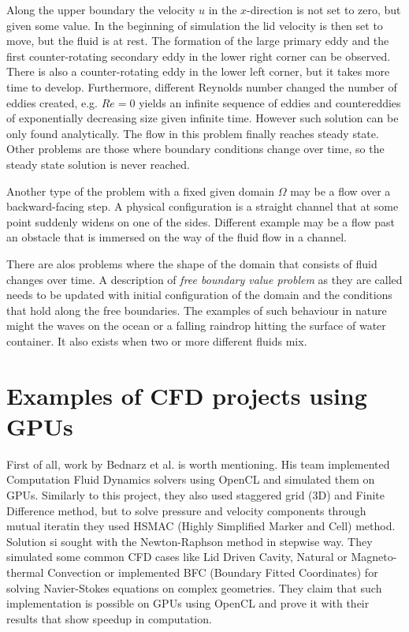 
Along the upper boundary the velocity $u$ in the $x$-direction is not set to zero, but given some value. In the beginning of simulation the lid velocity is then set to move, but the fluid is at rest. The formation of the large primary eddy and the first counter-rotating secondary eddy in the lower right corner can be observed. There is also a counter-rotating eddy in the lower left corner, but it takes more time to develop. Furthermore, different Reynolds number changed the number of eddies created, e.g. $Re = 0$ yields an infinite sequence of eddies and countereddies of exponentially decreasing size given infinite time. However such solution can be only found analytically. The flow in this problem finally reaches steady state. Other problems are those where boundary conditions change over time, so the steady state solution is never reached.

Another type of the problem with a fixed given domain $\Omega$ may be a flow over a backward-facing step. A physical configuration is a straight channel that at some point suddenly widens on one of the sides. Different example may be a flow past an obstacle that is immersed on the way of the fluid flow in a channel.

There are alos problems where the shape of the domain that consists of fluid changes over time. A description of \emph{free boundary value problem} as they are called needs to be updated with initial configuration of the domain and the conditions that hold along the free boundaries. The examples of such behaviour in nature might the waves on the ocean or a falling raindrop hitting the surface of water container. It also exists when two or more different fluids mix. 

\section{Examples of CFD projects using GPUs}
First of all, work by Bednarz et al. is worth mentioning. His team implemented Computation Fluid Dynamics solvers using OpenCL and simulated them on GPUs. Similarly to this project, they also used staggered grid (3D) and Finite Difference method, but to solve pressure and velocity components through mutual iteratin they used HSMAC (Highly Simplified Marker and Cell) method. Solution si sought with the Newton-Raphson method in stepwise way. They simulated some common CFD cases like Lid Driven Cavity, Natural or Magneto-thermal Convection or implemented BFC (Boundary Fitted Coordinates) for solving Navier-Stokes equations on complex geometries. They claim that such implementation is possible on GPUs using OpenCL and prove it with their results that show speedup in computation.\cite{bednarz2010gpu, bednarz2011computational}

